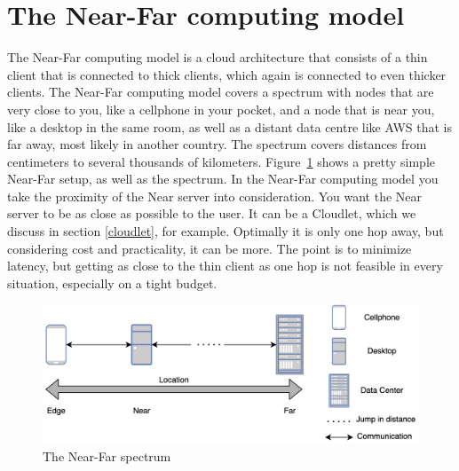 


\section{The Near-Far computing model}
The Near-Far computing model is a cloud architecture that consists of a thin client that is connected to thick clients, which again is connected to even thicker clients. The Near-Far computing model covers a spectrum with nodes that are very close to you, like a cellphone in your pocket, and a node that is near you, like a desktop in the same room, as well as a distant data centre like AWS that is far away, most likely in another country. The spectrum covers distances from centimeters to several thousands of kilometers. Figure~\ref{fig:nearFarSimple} shows a pretty simple Near-Far setup, as well as the spectrum. In the Near-Far computing model you take the proximity of the Near server into consideration. You want the Near server to be as close as possible to the user. It can be a Cloudlet, which we discuss in section \ref{cloudlet}, for example. Optimally it is only one hop away, but considering cost and practicality, it can be more. The point is to minimize latency, but getting as close to the thin client as one hop is not feasible in every situation, especially on a tight budget.

\begin{figure}[t]
    \centering
    \includegraphics[scale=0.7]{chapters/background/figures/near-far-diagram.png}
    \caption{The Near-Far spectrum}
    \label{fig:nearFarSimple}
\end{figure}


